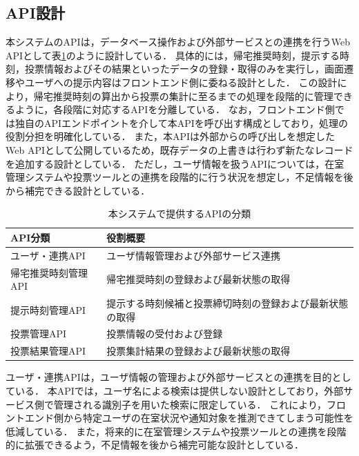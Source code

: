 \subsection{API設計}%
本システムのAPIは，データベース操作および外部サービスとの連携を行うWeb APIとして表\ref{tab:thisAPI}のように設計している．
具体的には，帰宅推奨時刻，提示する時刻，投票情報およびその結果といったデータの登録・取得のみを実行し，画面遷移やユーザへの提示内容はフロントエンド側に委ねる設計とした．
この設計により，帰宅推奨時刻の算出から投票の集計に至るまでの処理を段階的に管理できるように，各段階に対応するAPIを分離している．
なお，フロントエンド側では独自のAPIエンドポイントを介して本APIを呼び出す構成としており，処理の役割分担を明確化している．
また，本APIは外部からの呼び出しを想定したWeb APIとして公開しているため，既存データの上書きは行わず新たなレコードを追加する設計としている．
ただし，ユーザ情報を扱うAPIについては，在室管理システムや投票ツールとの連携を段階的に行う状況を想定し，不足情報を後から補完できる設計としている．


\begin{table}[htb]
  \centering
  \caption{本システムで提供するAPIの分類}
  \label{tab:thisAPI}
  \begin{tabular}{|l|l|}
    \hline
    \textbf{API分類} & \textbf{役割概要}                \\
    \hline
    ユーザ・連携API      & ユーザ情報管理および外部サービス連携           \\
    帰宅推奨時刻管理API    & 帰宅推奨時刻の登録および最新状態の取得          \\
    提示時刻管理API      & 提示する時刻候補と投票締切時刻の登録および最新状態の取得 \\
    投票管理API        & 投票情報の受付および登録                 \\
    投票結果管理API      & 投票集計結果の登録および最新状態の取得          \\
    \hline
  \end{tabular}
\end{table}


ユーザ・連携APIは，ユーザ情報の管理および外部サービスとの連携を目的としている．
本APIでは，ユーザ名による検索は提供しない設計としており，外部サービス側で管理される識別子を用いた検索に限定している．
これにより，フロントエンド側から特定ユーザの在室状況や通知対象を推測できてしまう可能性を低減している．
また，将来的に在室管理システムや投票ツールとの連携を段階的に拡張できるよう，不足情報を後から補完可能な設計としている．


